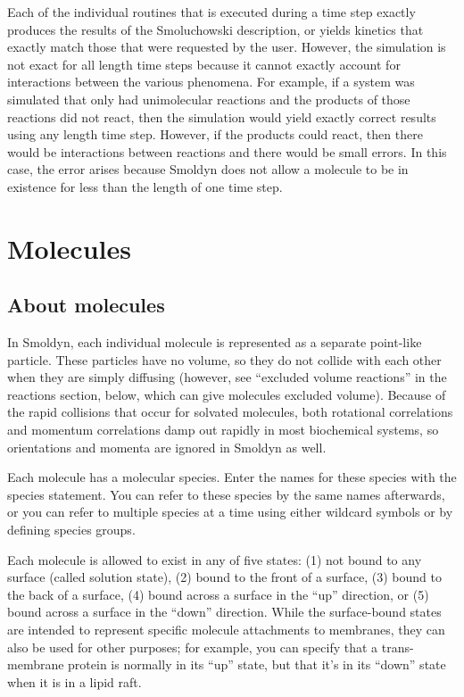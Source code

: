 \documentclass {scrbook}
\begin{document}
Each of the individual routines that is executed during a time step exactly produces the results of the Smoluchowski description, or yields kinetics that exactly match those that were requested by the user. However, the simulation is not exact for all length time steps because it cannot exactly account for interactions between the various phenomena. For example, if a system was simulated that only had unimolecular reactions and the products of those reactions did not react, then the simulation would yield exactly correct results using any length time step. However, if the products could react, then there would be interactions between reactions and there would be small errors. In this case, the error arises because Smoldyn does not allow a molecule to be in existence for less than the length of one time step.

\chapter{Molecules}

\section{About molecules}

In Smoldyn, each individual molecule is represented as a separate point-like particle. These particles have no volume, so they do not collide with each other when they are simply diffusing (however, see ``excluded volume reactions'' in the reactions section, below, which can give molecules excluded volume). Because of the rapid collisions that occur for solvated molecules, both rotational correlations and momentum correlations damp out rapidly in most biochemical systems, so orientations and momenta are ignored in Smoldyn as well.

Each molecule has a molecular species. Enter the names for these species with the species statement. You can refer to these species by the same names afterwards, or you can refer to multiple species at a time using either wildcard symbols or by defining species groups.

Each molecule is allowed to exist in any of five states: (1) not bound to any surface (called solution state), (2) bound to the front of a surface, (3) bound to the back of a surface, (4) bound across a surface in the ``up'' direction, or (5) bound across a surface in the ``down'' direction. While the surface-bound states are intended to represent specific molecule attachments to membranes, they can also be used for other purposes; for example, you can specify that a trans-membrane protein is normally in its ``up'' state, but that it's in its ``down'' state when it is in a lipid raft.
\end{document}
